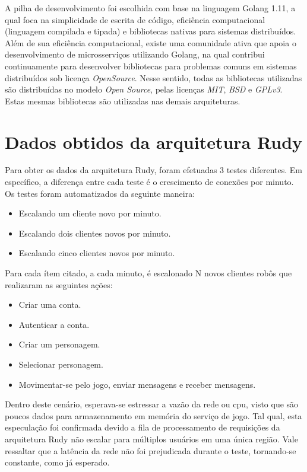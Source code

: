 A pilha de desenvolvimento foi escolhida com base na linguagem Golang 1.11, a qual foca na simplicidade de escrita de código, eficiência computacional (linguagem compilada e tipada) e bibliotecas nativas para sistemas distribuídos.
%
Além de sua eficiência computacional, existe uma comunidade ativa que apoia o desenvolvimento de microsserviços utilizando Golang, na qual contribui continuamente para desenvolver bibliotecas para problemas comuns em sistemas distribuídos sob licença \textit{OpenSource}.
%
Nesse sentido, todas as bibliotecas utilizadas são distribuídas no modelo \textit{Open Source}, pelas licenças \textit{MIT}, \textit{BSD} e \textit{GPLv3}.
%
Estas mesmas bibliotecas são utilizadas nas demais arquiteturas.

 
\section{Dados obtidos da arquitetura Rudy}
\label{sec:dados_rudy}
Para obter os dados da arquitetura Rudy, foram efetuadas 3 testes diferentes.
%
Em específico, a diferença entre cada teste é o crescimento de conexões por minuto.
%
Os testes foram automatizados da seguinte maneira:

\begin{itemize}
 \item Escalando um cliente novo por minuto.
 \item Escalando dois clientes novos por minuto.
 \item Escalando cinco clientes novos por minuto.
\end{itemize}

Para cada ítem citado, a cada minuto, é escalonado N novos clientes robôs que realizaram as seguintes ações:

\begin{itemize}
 \item Criar uma conta.
 \item Autenticar a conta.
 \item Criar um personagem.
 \item Selecionar personagem.
 \item Movimentar-se pelo jogo, enviar mensagens e receber mensagens.
\end{itemize}

Dentro deste cenário, esperava-se estressar a vazão da rede ou \ac{cpu}, visto que são poucos dados para armazenamento em memória do serviço de jogo.
%
Tal qual, esta especulação foi confirmada devido a fila de processamento de requisições da arquitetura Rudy não escalar para múltiplos usuários em uma única região.
%
Vale ressaltar que a latência da rede não foi prejudicada durante o teste, tornando-se constante, como já esperado.


